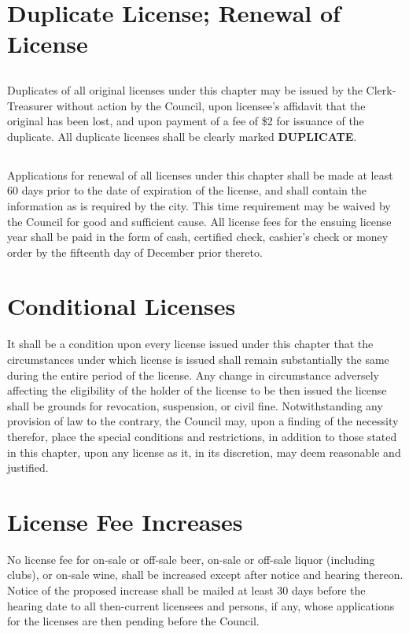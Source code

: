\section{Duplicate License; Renewal of License}
\subsection{}
Duplicates of all original licenses under this chapter may be issued by the Clerk-Treasurer without action by the Council, upon licensee’s affidavit that the original has been lost, and upon payment of a fee of \$2 for issuance of the duplicate.  All duplicate licenses shall be clearly marked \textbf{DUPLICATE}.
\subsection{}
Applications for renewal of all licenses under this chapter shall be made at least 60 days prior to the date of expiration of the license, and shall contain the information as is required by the city.  This time requirement may be waived by the Council for good and sufficient cause.  All license fees for the ensuing license year shall be paid in the form of cash, certified check, cashier’s check or money order by the fifteenth day of December prior thereto.

\section{Conditional Licenses}
It shall be a condition upon every license issued under this chapter that the circumstances under which license is issued shall remain substantially the same during the entire period of the license.  Any change in circumstance adversely affecting the eligibility of the holder of the license to be then issued the license shall be grounds for revocation, suspension, or civil fine.  Notwithstanding any provision of law to the contrary, the Council may, upon a finding of the necessity therefor, place the special conditions and restrictions, in addition to those stated in this chapter, upon any license as it, in its discretion, may deem reasonable and justified.

\section{License Fee Increases}
No license fee for on-sale or off-sale beer, on-sale or off-sale liquor (including clubs), or on-sale wine, shall be increased except after notice and hearing thereon.  Notice of the proposed increase shall be mailed at least 30 days before the hearing date to all then-current licensees and persons, if any, whose applications for the licenses are then pending before the Council.

